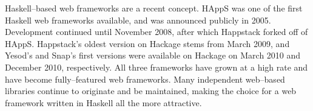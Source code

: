 Haskell--based web frameworks are a recent concept.
HAppS was one of the first Haskell web frameworks available, and was announced publicly in 2005. Development continued until November 2008, after which Happstack forked off of HAppS.
Happstack's oldest version on Hackage stems from March 2009, and Yesod's and Snap's first versions were available on Hackage on March 2010 and December 2010, respectively.
All three frameworks have grown at a high rate and have become fully--featured web frameworks.
Many independent web--based libraries continue to originate and be maintained, making the choice for a web framework written in Haskell all the more attractive.